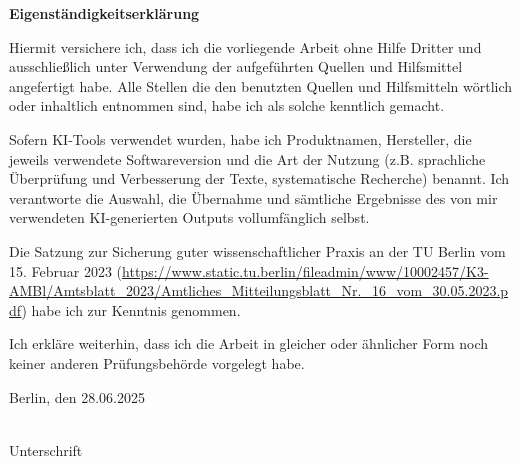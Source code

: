 \documentclass[
	a4paper,
	pagesize,
	pdftex,
	12pt,
	ngerman,
	fleqn,
	final,
	]{scrartcl}
\begin{document}
\thispagestyle{empty} %

\begin{center}
    \vspace*{1cm} %
    \Large\textbf{Eigenständigkeitserklärung}
\end{center}
\vspace{1.5cm} %

\noindent Hiermit versichere ich, dass ich die vorliegende Arbeit ohne Hilfe Dritter und ausschließlich unter Verwendung der aufgeführten Quellen und Hilfsmittel angefertigt habe. Alle Stellen die den benutzten Quellen und Hilfsmitteln wörtlich oder inhaltlich entnommen sind, habe ich als solche kenntlich gemacht.

\vspace{1cm}
\noindent Sofern KI-Tools verwendet wurden, habe ich Produktnamen, Hersteller, die jeweils verwendete Softwareversion und die Art der Nutzung (z.B. sprachliche Überprüfung und Verbesserung der Texte, systematische Recherche) benannt. Ich verantworte die Auswahl, die Übernahme und sämtliche Ergebnisse des von mir verwendeten KI-generierten Outputs vollumfänglich selbst.
\vspace{1cm}

\noindent Die Satzung zur Sicherung guter wissenschaftlicher Praxis an der TU Berlin vom 15. Februar 2023 (\url{https://www.static.tu.berlin/fileadmin/www/10002457/K3-AMBl/Amtsblatt_2023/Amtliches_Mitteilungsblatt_Nr._16_vom_30.05.2023.pdf}) habe ich zur Kenntnis genommen.

\vspace{1cm}
\noindent Ich erkläre weiterhin, dass ich die Arbeit in gleicher oder ähnlicher Form noch keiner anderen Prüfungsbehörde vorgelegt habe.

\vspace{2cm} %

\noindent Berlin, den 28.06.2025 %

\vspace{4cm} %

\noindent\makebox[10cm]{\dotfill} \\ %
Unterschrift

\clearpage
\end{document}
